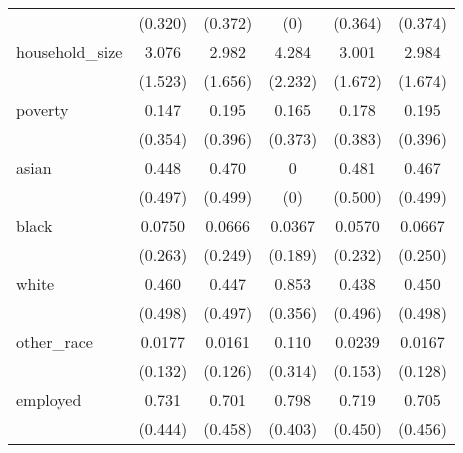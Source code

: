 \begin{table}[htbp]
\begin{tabular}{l*{5}{c}}
                    &     (0.320)         &     (0.372)         &         (0)         &     (0.364)         &     (0.374)         \\
[1em]
household\_size      &       3.076         &       2.982         &       4.284         &       3.001         &       2.984         \\
                    &     (1.523)         &     (1.656)         &     (2.232)         &     (1.672)         &     (1.674)         \\
[1em]
poverty             &       0.147         &       0.195         &       0.165         &       0.178         &       0.195         \\
                    &     (0.354)         &     (0.396)         &     (0.373)         &     (0.383)         &     (0.396)         \\
[1em]
asian               &       0.448         &       0.470         &           0         &       0.481         &       0.467         \\
                    &     (0.497)         &     (0.499)         &         (0)         &     (0.500)         &     (0.499)         \\
[1em]
black               &      0.0750         &      0.0666         &      0.0367         &      0.0570         &      0.0667         \\
                    &     (0.263)         &     (0.249)         &     (0.189)         &     (0.232)         &     (0.250)         \\
[1em]
white               &       0.460         &       0.447         &       0.853         &       0.438         &       0.450         \\
                    &     (0.498)         &     (0.497)         &     (0.356)         &     (0.496)         &     (0.498)         \\
[1em]
other\_race          &      0.0177         &      0.0161         &       0.110         &      0.0239         &      0.0167         \\
                    &     (0.132)         &     (0.126)         &     (0.314)         &     (0.153)         &     (0.128)         \\
[1em]
employed            &       0.731         &       0.701         &       0.798         &       0.719         &       0.705         \\
                    &     (0.444)         &     (0.458)         &     (0.403)         &     (0.450)         &     (0.456)         \\

\end{tabular}
\end{table}
